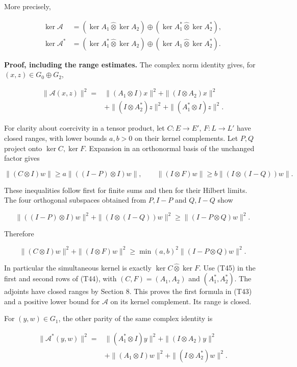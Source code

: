\documentclass[
  11pt,
]{article}
\begin{document}
More precisely,

\[
\begin{aligned}
\ker\mathcal A
&=(\ker A_1\widehat\otimes\ker A_2)
\oplus(\ker A_1^*\widehat\otimes\ker A_2^*),\\
\ker\mathcal A^*
&=(\ker A_1^*\widehat\otimes\ker A_2)
\oplus(\ker A_1\widehat\otimes\ker A_2^*).
\end{aligned}                                               \tag{T43}
\]

\textbf{Proof, including the range estimates.} The complex norm identity
gives, for \((x,z)\in G_0\oplus G_2\),

\[
\begin{aligned}
\|\mathcal A(x,z)\|^2={}&
\|(A_1\otimes I)x\|^2+\|(I\otimes A_2)x\|^2\\
&+\|(I\otimes A_2^*)z\|^2+\|(A_1^*\otimes I)z\|^2.
\end{aligned}                                               \tag{T44}
\]

For clarity about coercivity in a tensor product, let \(C:E\to E'\),
\(F:L\to L'\) have closed ranges, with lower bounds \(a,b>0\) on their
kernel complements. Let \(P,Q\) project onto \(\ker C,\ker F\).
Expansion in an orthonormal basis of the unchanged factor gives

\[
\|(C\otimes I)w\|\geq a\|((I-P)\otimes I)w\|,\qquad
\|(I\otimes F)w\|\geq b\|(I\otimes(I-Q))w\|.
\]

These inequalities follow first for finite sums and then for their
Hilbert limits. The four orthogonal subspaces obtained from \(P,I-P\)
and \(Q,I-Q\) show

\[
\|((I-P)\otimes I)w\|^2+\|(I\otimes(I-Q))w\|^2
\geq\|(I-P\otimes Q)w\|^2.
\]

Therefore

\[
\|(C\otimes I)w\|^2+\|(I\otimes F)w\|^2
\geq\min(a,b)^2\|(I-P\otimes Q)w\|^2.                       \tag{T45}
\]

In particular the simultaneous kernel is exactly
\(\ker C\widehat\otimes\ker F\). Use (T45) in the first and second rows
of (T44), with \((C,F)=(A_1,A_2)\) and \((A_1^*,A_2^*)\). The adjoints
have closed ranges by Section 8. This proves the first formula in (T43)
and a positive lower bound for \(\mathcal A\) on its kernel complement.
Its range is closed.

For \((y,w)\in G_1\), the other parity of the same complex identity is

\[
\begin{aligned}
\|\mathcal A^*(y,w)\|^2={}&
\|(A_1^*\otimes I)y\|^2+\|(I\otimes A_2)y\|^2\\
&+\|(A_1\otimes I)w\|^2+\|(I\otimes A_2^*)w\|^2.
\end{aligned}
\]
\end{document}
